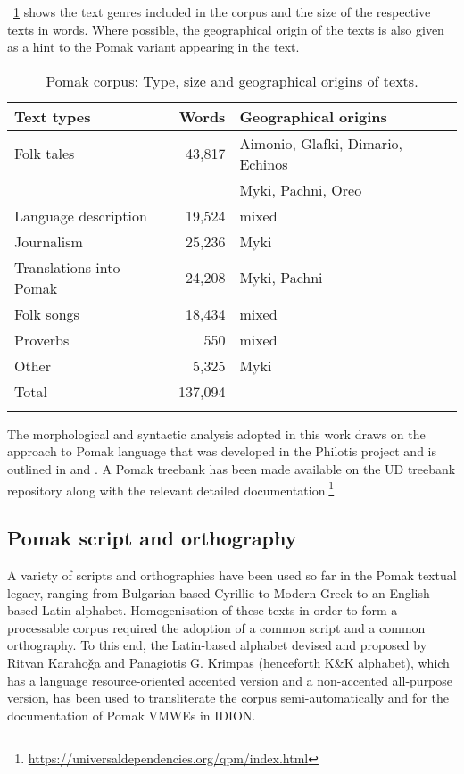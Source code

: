 \documentclass[output=paper,colorlinks,citecolor=brown]{langscibook}
\begin{document}
\tablename~\ref{tab:table1} shows the text genres included in the corpus and the size of the respective texts in words. Where possible, the geographical origin of the texts is also given as a hint to the  Pomak variant appearing in the text.


\begin{table}[hbt!]
\centering
\begin{tabular}{lrl}
\lsptoprule
Text types & Words & Geographical origins \\
\midrule
Folk tales & 43,817 & Aimonio, Glafki, Dimario, Echinos\\
           &        & Myki, Pachni, Oreo\\
Language description & 19,524 & mixed \\ 
Journalism & 25,236 & Myki \\ 
Translations into Pomak & 24,208 & Myki, Pachni \\
Folk songs              & 18,434 & mixed \\
Proverbs                & 550 & mixed \\
Other                   & 5,325 & Myki \\
\midrule
Total & 137,094 & \\
\lspbottomrule
\end{tabular}
\caption{Pomak corpus: Type, size and geographical origins of texts.\label{tab:table1}}
\end{table}


The morphological and syntactic analysis adopted in this work draws on the approach to Pomak language that was developed in the Philotis project and is outlined in \citet{karahoga-morphologically} and \citet{gurt2023}. A Pomak treebank has been made available on the UD treebank repository along with the relevant detailed documentation.\footnote{\url{https://universaldependencies.org/qpm/index.html}}

\subsection{Pomak script and orthography}
\label{sec:script}

A variety of scripts and orthographies have been used so far in the Pomak textual legacy, ranging from Bulgarian-based Cyrillic to Modern Greek to an English-based Latin alphabet. Homogenisation of these texts in order to form a processable corpus required the adoption of a common script and a common orthography. To this end,  the Latin-based alphabet devised and proposed by Ritvan Karahoǧa and Panagiotis G. Krimpas (henceforth K\&K alphabet), which has a language resource-oriented accented version and a non-accented all-purpose version, has been used to transliterate the corpus semi-automatically and for the documentation of Pomak VMWEs in IDION. 
\end{document}
